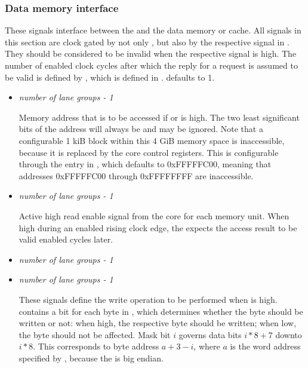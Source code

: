 
\subsubsection{Data memory interface}
\label{sec:core-ug-cfg-inst-iface-dmem}

These signals interface between the \rvex{} and the data memory or cache. All 
signals in this section are clock gated by not only , but also by 
the respective signal in . They should be considered to be 
invalid when the respective  signal is high. The number of 
enabled clock cycles after which the reply for a request is assumed to be valid 
is defined by , which is defined in . 
 defaults to 1.

\begin{itemize}
  
\item {}\textit{number of lane groups - 1}

Memory address that is to be accessed if  or 
 is high. The two least significant bits of the 
address will always be  and may be ignored. Note that a configurable 
1 kiB block within this 4 GiB memory space is inaccessible, because it is 
replaced by the core control registers. This is configurable through the 
 entry in , which defaults to 0xFFFFFC00, 
meaning that addresses 0xFFFFFC00 through 0xFFFFFFFF are inaccessible.

\vspace{1em}
\item {}\textit{number of lane groups - 1}

Active high read enable signal from the core for each memory unit. When high 
during an enabled rising clock edge, the \rvex{} expects the access result to be 
valid  enabled cycles later.

\vspace{1em}
\item {}\textit{number of lane groups - 1}
\item {}\textit{number of lane groups - 1}

These signals define the write operation to be performed when 
 is high.  contains a bit for 
each byte in , which determines whether the byte should 
be written or not: when high, the respective byte should be written; when low, 
the byte should not be affected. Mask bit $i$ governs data bits $i*8+7$ downto 
$i*8$. This corresponds to byte address $a + 3 - i$, where $a$ is the word
address specified by , because the \rvex{} is big endian.


\end{itemize}
